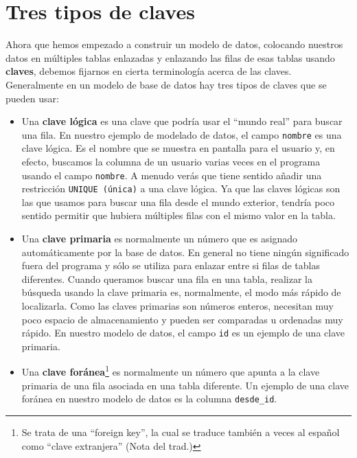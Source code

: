 \section{Tres tipos de claves}

Ahora que hemos empezado a construir un modelo de datos, colocando
nuestros datos en múltiples tablas enlazadas y enlazando las filas de esas
tablas usando {\bf claves}, debemos fijarnos en cierta terminología
acerca de las claves. Generalmente en un modelo de base de datos hay
tres tipos de claves que se pueden usar:

\begin{itemize}

\item Una {\bf clave lógica} es una clave que podría usar el ``mundo real''
para buscar una fila. En nuestro ejemplo de modelado de datos, el campo
{\tt nombre} es una clave lógica. Es el nombre que se muestra en pantalla para el usuario
y, en efecto, buscamos la columna de un usuario varias veces en el programa
usando el campo {\tt nombre}. A menudo verás que tiene sentido
añadir una restricción {\tt UNIQUE (única)} a una clave lógica. Ya que las
claves lógicas son las que usamos para buscar una fila desde el mundo exterior, tendría
poco sentido permitir que hubiera múltiples filas con el mismo valor en la tabla.

\item Una {\bf clave primaria} es normalmente un número que es asignado
automáticamente por la base de datos. En general no tiene ningún significado fuera
del programa y sólo se utiliza para enlazar entre si filas de tablas diferentes.
Cuando queramos buscar una fila en una tabla, realizar
la búsqueda usando la clave primaria es, normalmente, el modo
más rápido de localizarla. Como las claves primarias son números enteros,
necesitan muy poco espacio de almacenamiento y pueden ser comparadas u ordenadas muy rápido.
En nuestro modelo de datos, el campo {\tt id} es un ejemplo de una clave primaria.

\item Una {\bf clave foránea}\footnote{Se trata de una ``foreign key'', la cual se traduce
también a veces al español como ``clave extranjera'' (Nota del trad.)}
 es normalmente un número que apunta a la clave primaria
de una fila asociada en una tabla diferente. Un ejemplo de una clave foránea
en nuestro modelo de datos es la columna \verb"desde_id".

\end{itemize}

